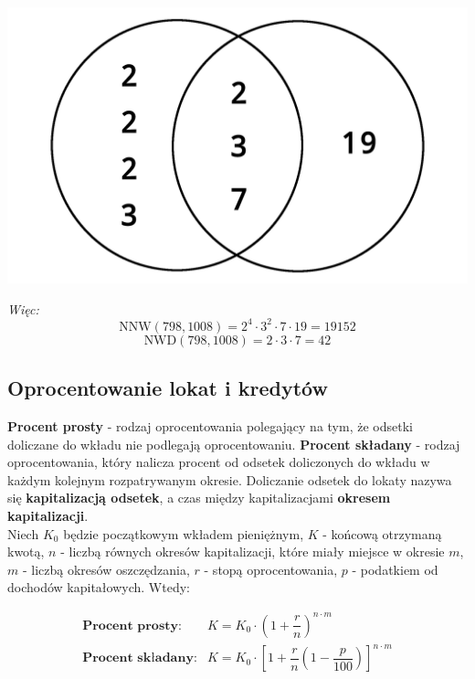 \documentclass[14pt,a4paper]{extarticle}
\begin{document}
\includegraphics{viete-lcd.png}

\textit{Więc:}\\
$$\text{NNW}(798, 1008) = 2^{4} \cdot 3^{2} \cdot 7 \cdot 19 = 19152$$
$$\text{NWD}(798, 1008) = 2 \cdot 3 \cdot 7 = 42$$\hfill\break

\noindent\subsection{Oprocentowanie lokat i kredytów}

\noindent\textbf{Procent prosty}
 - rodzaj oprocentowania polegający na tym, że odsetki doliczane do wkładu nie podlegają oprocentowaniu.\hfill\break
\noindent\textbf{Procent składany}
 - rodzaj oprocentowania, który nalicza procent od odsetek doliczonych do wkładu w każdym kolejnym rozpatrywanym okresie.\hfill\break
 Doliczanie odsetek do lokaty nazywa się \textbf{kapitalizacją odsetek}, a czas między kapitalizacjami \textbf{okresem kapitalizacji}.\hfill\break\\

\noindent Niech $K_{0}$ będzie początkowym wkładem pieniężnym, $K$ - końcową otrzymaną kwotą, $n$ - liczbą równych okresów kapitalizacji, które miały miejsce w okresie $m$, $m$ - liczbą okresów oszczędzania, $r$ - stopą oprocentowania, $p$ - podatkiem od dochodów kapitałowych.
Wtedy:



\renewcommand{\arraystretch}{2}
\setlength{\arrayrulewidth}{0.5mm}

\begin{equation*}
   \begin{array}{lc}
      \textbf{Procent prosty:} & K = K_{0}\cdot\left(1+\dfrac{r}{n}\right)^{n\cdot m}\\
      \textbf{Procent składany:} & K = K_{0}\cdot\left[ 1+\dfrac{r}{n}\left(1 - \dfrac{p}{100}\right)\right]^{n\cdot m}
   \end{array}
\end{equation*}
\end{document}
